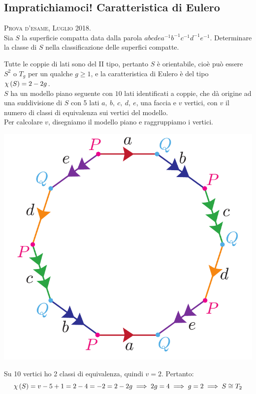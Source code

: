 \subsection{Impratichiamoci! Caratteristica di Eulero}
\begin{exercise}\textsc{Prova d'esame, Luglio 2018.}\\
Sia $S$ la superficie compatta data dalla parola $abcdea^{-1}b^{-1}c^{-1}d^{-1}e^{-1}$. Determinare la classe di $S$ nella classificazione delle superfici compatte.
\end{exercise}
\begin{solution}
	Tutte le coppie di lati sono del II tipo, pertanto $S$ è orientabile, cioè può essere $S^2$ o $T_g$ per un qualche $g\geq 1$, e la caratteristica di Eulero è del tipo $\euler{S}{\ }=2-2g$.\\
	$S$ ha un modello piano seguente con $10$ lati identificati a coppie, che dà origine ad una suddivisione di $S$ con 5 lati $a,\ b,\ c,\ d,\ e$, una faccia e $v$ vertici, con $v$ il numero di classi di equivalenza sui vertici del modello.\\
	Per calcolare $v$, disegniamo il modello piano e raggruppiamo i vertici.
	\begin{center}
		\includegraphics[trim=0cm 0cm 0cm 0cm, clip, scale=0.375]{images/modellopianoexercise.pdf}
	\end{center}
Su 10 vertici ho 2 classi di equivalenza, quindi $v=2$. Pertanto:
\begin{equation*}
	\euler{S}{\ }=v-5+1=2-4=-2=2-2g\implies 2g=4\implies g=2\implies S\cong T_2
\end{equation*}
\vspace{-6mm}
\end{solution}
